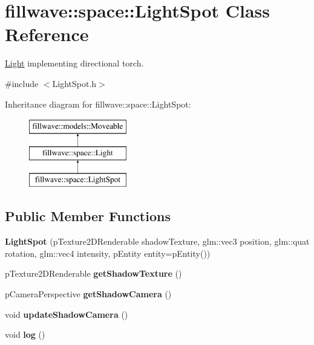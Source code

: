 \hypertarget{classfillwave_1_1space_1_1LightSpot}{}\section{fillwave\+:\+:space\+:\+:Light\+Spot Class Reference}
\label{classfillwave_1_1space_1_1LightSpot}


\hyperlink{classfillwave_1_1space_1_1Light}{Light} implementing directional torch.  




{\ttfamily \#include $<$Light\+Spot.\+h$>$}

Inheritance diagram for fillwave\+:\+:space\+:\+:Light\+Spot\+:\begin{figure}[H]
\begin{center}
\leavevmode
\includegraphics[height=3.000000cm]{classfillwave_1_1space_1_1LightSpot}
\end{center}
\end{figure}
\subsection*{Public Member Functions}
\begin{DoxyCompactItemize}
\item 
\hypertarget{classfillwave_1_1space_1_1LightSpot_ad2de5a9d21cb29127bb2a6a13f0cda05}{}{\bfseries Light\+Spot} (p\+Texture2\+D\+Renderable shadow\+Texture, glm\+::vec3 position, glm\+::quat rotation, glm\+::vec4 intensity, p\+Entity entity=p\+Entity())\label{classfillwave_1_1space_1_1LightSpot_ad2de5a9d21cb29127bb2a6a13f0cda05}

\item 
\hypertarget{classfillwave_1_1space_1_1LightSpot_ac5ccc0c95e9ea3450a321cacd74d29c2}{}p\+Texture2\+D\+Renderable {\bfseries get\+Shadow\+Texture} ()\label{classfillwave_1_1space_1_1LightSpot_ac5ccc0c95e9ea3450a321cacd74d29c2}

\item 
\hypertarget{classfillwave_1_1space_1_1LightSpot_a70b3b4e8742f171c0e4d08dd7ef3cc39}{}p\+Camera\+Perspective {\bfseries get\+Shadow\+Camera} ()\label{classfillwave_1_1space_1_1LightSpot_a70b3b4e8742f171c0e4d08dd7ef3cc39}

\item 
\hypertarget{classfillwave_1_1space_1_1LightSpot_a316a1eba3b245a9d961c4f89bd6a68b6}{}void {\bfseries update\+Shadow\+Camera} ()\label{classfillwave_1_1space_1_1LightSpot_a316a1eba3b245a9d961c4f89bd6a68b6}

\item 
\hypertarget{classfillwave_1_1space_1_1LightSpot_a71982dc9a709282f04b8bf52702f0877}{}void {\bfseries log} ()\label{classfillwave_1_1space_1_1LightSpot_a71982dc9a709282f04b8bf52702f0877}

\end{DoxyCompactItemize}
